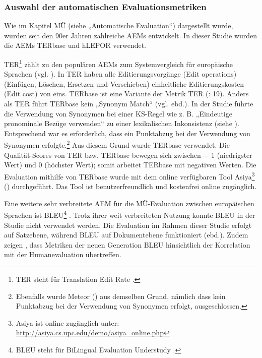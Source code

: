 \subsubsection{\label{sec:4.4.6.3}Auswahl der automatischen Evaluationsmetriken}

Wie im Kapitel MÜ (siehe  „Automatische Evaluation“) dargestellt wurde, wurden seit den 90er Jahren zahlreiche AEMs entwickelt. In dieser Studie wurden die AEMs TERbase \citep{SnoverEtAl2006} und hLEPOR \citep{HanEtAl2013} verwendet.

TER\footnote{TER steht für Translation Edit Rate \citep{SnoverEtAl2006}.} \citep{SnoverEtAl2006} zählt zu den populären AEMs zum Systemvergleich für europäische Sprachen (vgl. \citealt{Doherty2017}). In TER haben alle Editierungsvorgänge (Edit operations) (Einfügen, Löschen, Ersetzen und Verschieben) einheitliche Editierungskosten (Edit cost) von eins. TERbase ist eine Variante der Metrik TER (\citealt{GonzàlezGiménez2014}: 19). Anders als TER führt TERbase kein „Synonym Match“ (vgl. ebd.). In der Studie führte die Verwendung von Synonymen bei einer KS-Regel wie z. B. „Eindeutige pronominale Bezüge verwenden“ zu einer lexikalischen Inkonsistenz (siehe ). Entsprechend war es erforderlich, dass ein Punktabzug bei der Verwendung von Synonymen erfolgte.\footnote{Ebenfalls wurde Meteor (\citealt{BanerjeeLavie2005}) aus demselben Grund, nämlich dass kein Punktabzug bei der Verwendung von Synonymen erfolgt, ausgeschlossen.} Aus diesem Grund wurde TERbase verwendet. Die Qualität-Scores von TER bzw. TERbase bewegen sich zwischen $-$ 1 (niedrigster Wert) und 0 (höchster Wert); somit arbeitet TERbase mit negativen Werten. Die Evaluation mithilfe von TERbase wurde mit dem online verfügbaren Tool Asiya\footnote{{{{Asiya ist online zugänglich unter:} }}\url{http://asiya.cs.upc.edu/demo/asiya_online.php}} (\citealt{GonzàlezGiménez2014}) durchgeführt. Das Tool ist benutzerfreundlich und kostenfrei online zugänglich.

Eine weitere sehr verbreitete AEM für die MÜ-Evaluation zwischen europäischen Sprachen ist BLEU\footnote{{BLEU steht für BiLingual Evaluation Understudy \citep{PapineniEtAl2002}.}} \citep{PapineniEtAl2002}. Trotz ihrer weit verbreiteten Nutzung konnte BLEU in der Studie nicht verwendet werden. Die Evaluation im Rahmen dieser Studie erfolgt auf Satzebene, während BLEU auf Dokumentebene funktioniert (ebd.). Zudem zeigen \citet{Callison-BurchEtAl2009}, dass Metriken der neuen Generation BLEU hinsichtlich der Korrelation mit der Humanevaluation übertreffen.

